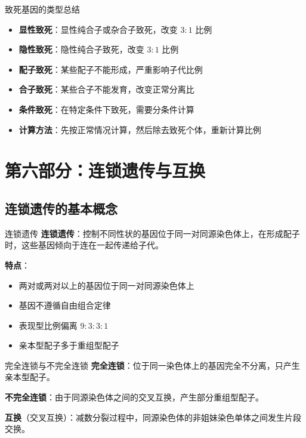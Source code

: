 \documentclass[a4paper,11pt]{ctexart}
\begin{document}
\begin{lemmabox}{致死基因的类型总结}
\begin{itemize}[leftmargin=2em]
    \item \textbf{显性致死}：显性纯合子或杂合子致死，改变 $3:1$ 比例
    \item \textbf{隐性致死}：隐性纯合子致死，改变 $3:1$ 比例
    \item \textbf{配子致死}：某些配子不能形成，严重影响子代比例
    \item \textbf{合子致死}：某些合子不能发育，改变正常分离比
    \item \textbf{条件致死}：在特定条件下致死，需要分条件计算
    \item \textbf{计算方法}：先按正常情况计算，然后除去致死个体，重新计算比例
\end{itemize}
\end{lemmabox}


\section{第六部分：连锁遗传与互换}

\subsection{连锁遗传的基本概念}

\begin{definitionbox}{连锁遗传}
\textbf{连锁遗传}：控制不同性状的基因位于同一对同源染色体上，在形成配子时，这些基因倾向于连在一起传递给子代。

\textbf{特点}：
\begin{itemize}[leftmargin=2em]
    \item 两对或两对以上的基因位于同一对同源染色体上
    \item 基因不遵循自由组合定律
    \item 表现型比例偏离 $9:3:3:1$
    \item 亲本型配子多于重组型配子
\end{itemize}
\end{definitionbox}

\begin{definitionbox}{完全连锁与不完全连锁}
\textbf{完全连锁}：位于同一染色体上的基因完全不分离，只产生亲本型配子。

\textbf{不完全连锁}：由于同源染色体之间的交叉互换，产生部分重组型配子。

\textbf{互换}（交叉互换）：减数分裂过程中，同源染色体的非姐妹染色单体之间发生片段交换。
\end{definitionbox}
\end{document}
